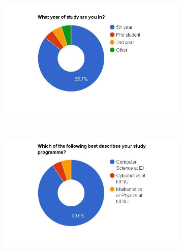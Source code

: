 \begin{figure}
    \centering
    \begin{subfigure}[h]{0.48\textwidth}
        \centerline{\includegraphics[width=1.5\textwidth]{results/year_of_study.jpg}}
        \caption{}
        \label{fig:year-of-study}
    \end{subfigure}
    ~ %
    \hfill
    \begin{subfigure}[h]{0.48\textwidth}
        \centerline{\includegraphics[width=1.5\textwidth]{results/study_programme.jpg}}
        \caption{}
        \label{fig:study-programme}
    \end{subfigure}


\end{figure}
